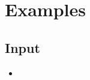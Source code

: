 \section{Examples}
\subsection{Input}
\begin{frame}
\begin{itemize}
  \item 
\end{itemize}
\end{frame}

